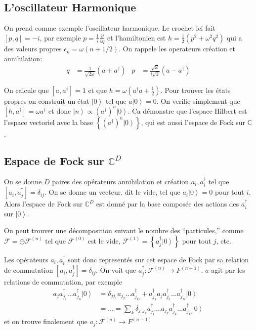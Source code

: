 \documentclass[10pt]{report}
\newcommand{\ket}[1]{\left|#1\right>}
\newcommand{\pd}[2]{\frac{\partial #1}{\partial#2}}
\begin{document}
\subsection{L'oscillateur Harmonique}

On prend comme exemple l'oscillateur harmonique. Le crochet ici fait $[p,q] = -i$, par exemple $p = \frac{1}{i}\pd{}{q}$ et l'hamiltonien est $h = \frac{1}{2}\left( p^2 + \omega^2q^2 \right)$ qui a des valeurs propres $\epsilon_n = \omega (n + 1/2)$. On rappele les operateurs cr\'eation et annihilation:
\begin{align}
    q &= \frac{1}{\sqrt{2\omega}}\left( a + a^\dagger \right) & p &= \frac{\sqrt{\omega}}{i\sqrt{2}}\left( a - a^\dagger \right)
\end{align}

On calcule que $\left[ a, a^\dagger \right] = 1$ et que $h = \omega\left( a^\dagger a + \frac{1}{2} \right)$. Pour trouver les \'etats propres on construit un \'etat $\ket{0}$ tel que $a\ket{0} = 0$. On verifie simplement que $\left[ h, a^\dagger \right] = \omega a^\dagger$ et donc $\ket{n} \propto \left( a^\dagger \right)^n\ket{0}$. Ca d\'emonstre que l'espace Hilbert est l'espace vectoriel avec la base $\left\{ \left( a^\dagger \right)^n\ket{0} \right\}$, qui est aussi l'espace de Fock sur $\mathbb{C}$. 

\subsection{Espace de Fock sur $\mathbb{C}^D$}

On se donne $D$ paires des op\'erateurs annihilation et cr\'eation $a_i, a_i^\dagger$ tel que $\left[ a_i, a^\dagger_j \right] = \delta_{ij}$. On se donne un vecteur, dit le vide, tel que $a_i \ket{0} = 0$ pour tout $i$. Alors l'espace de Fock sur $\mathbb{C}^D$ est donn\'e par la base compos\'ee des actions des $a_i^\dagger$ sur $\ket{0}$.

On peut trouver une d\'ecomposition suivant le nombre des ``particules,'' comme $\mathcal{F} = \oplus \mathcal{F}^{(n)}$ tel que $\mathcal{F}^{(0)}$ est le vide, $\mathcal{F}^{(1)} = \left\{ a_j^\dagger\ket{0} \right\}$ pour tout $j$, etc. 

Les op\'erateurs $a_i,a_i^\dagger$ sont donc represent\'es sur cet espace de Fock par sa relation de commutation $\left[ a_i, a_j^\dagger \right] = \delta_{ij}$. On voit que $a_j^\dagger: \mathcal{F}^{(n)} \to F^{(n+1)}$. $a$ agit par les relations de commutation, par exemple
\begin{align}
    a_j a_{j_1}^\dagger \dots a_{j_n}^\dagger \ket{0} &= \delta_{jj_1}a_{j_2}\dots a_{j_D}^\dagger + a_{j_1}^\dagger a_ja_{j_2}^\dagger\dots a_{j_D}^\dagger\ket{0}\\
    &= \dots = \sum\limits_{k}^{}\delta_{j, j_k} a_{j_1}^\dagger \dots a_{j_k}a_{j_k}^\dagger \dots a_{j_D}^\dagger \ket{0}
\end{align}
et on trouve finalement que $a_j: \mathcal{F}^{(n)} \to F^{(n-1)}$
\end{document}
